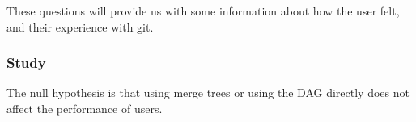 These questions will provide us with some information about how the user
felt, and their experience with git.

\subsubsection{Study}
\label{ssub:study}

The null hypothesis is that using merge trees or using the DAG directly
does not affect the performance of users.

